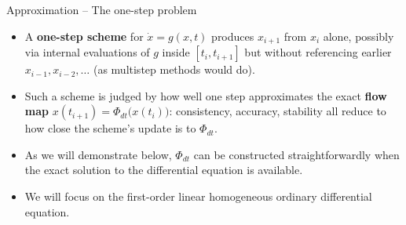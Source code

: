 \documentclass[11pt,aspectratio=169]{beamer}
\begin{document}
\begin{frame}{Approximation -- The one-step problem}

\begin{itemize}

\item A \textbf{one-step scheme} for $\dot x = g(x,t)$ produces
  $x_{i+1}$ from $x_i$ alone, possibly via internal evaluations of $g$
  inside $[t_i, t_{i+1}]$ but without referencing earlier
  $x_{i-1}, x_{i-2}, \ldots$ (as multistep methods would do).\newline

  \item Such a scheme is judged by how well one step approximates the
  exact \textbf{flow map} $x(t_{i+1}) = \Phi_{dt}\bigl(x(t_i)\bigr)$:
  consistency, accuracy, stability all reduce to how close the
  scheme's update is to $\Phi_{dt}$.\newline

\item As we will demonstrate below, $\Phi_{dt}$ can be constructed
  straightforwardly when the exact solution to the differential
  equation is available.\newline

\item We will focus on the first-order linear homogeneous ordinary
  differential equation.\newline

\end{itemize}

\end{frame}
\end{document}
